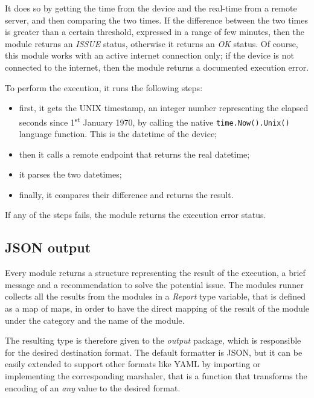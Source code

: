 It does so by getting the time from the device and the real-time from a remote server, and then comparing the two times. If the difference between the two times is greater than a certain threshold, expressed in a range of few minutes, then the module returns an \textit{ISSUE} status, otherwise it returns an \textit{OK} status. Of course, this module works with an active internet connection only; if the device is not connected to the internet, then the module returns a documented execution error.

To perform the execution, it runs the following steps:
\begin{itemize}
  \item first, it gets the UNIX timestamp, an integer number representing the elapsed seconds since 1\textsuperscript{st} January 1970, by calling the native \texttt{time.Now().Unix()} language function. This is the datetime of the device;
  \item then it calls a remote endpoint that returns the real datetime;
  \item it parses the two datetimes;
  \item finally, it compares their difference and returns the result.
\end{itemize}

If any of the steps fails, the module returns the execution error status.


\subsection{JSON output}
\label{sec:json-output}

Every module returns a structure representing the result of the execution, a brief message and a recommendation to solve the potential issue. The modules runner collects all the results from the modules in a \textit{Report} type variable, that is defined as a map of maps, in order to have the direct mapping of the result of the module under the category and the name of the module.

The resulting type is therefore given to the \textit{output} package, which is responsible for the desired destination format. The default formatter is JSON, but it can be easily extended to support other formats like YAML by importing or implementing the corresponding marshaler, that is a function that transforms the encoding of an \textit{any} value to the desired format.

